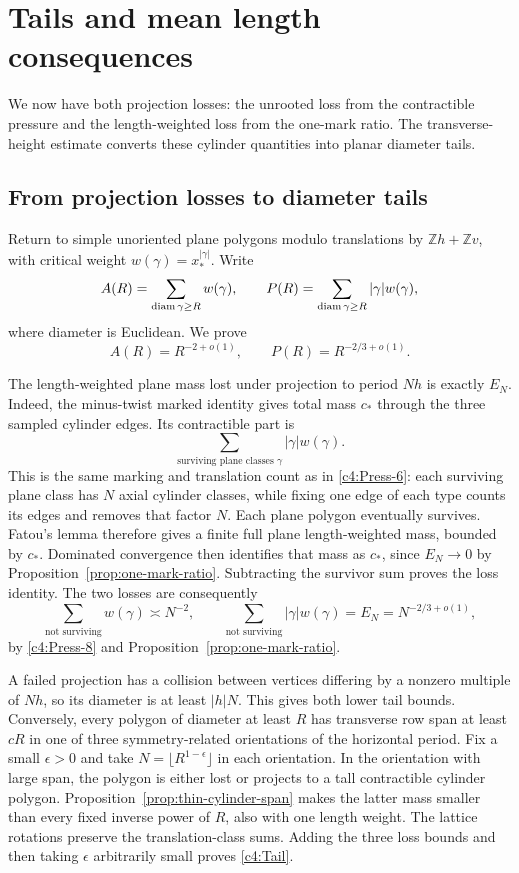 \section{Tails and mean length consequences}\label{c4:tails}

We now have both projection losses: the unrooted loss from the
contractible pressure and the length-weighted loss from the one-mark
ratio. The transverse-height estimate converts these cylinder
quantities into planar diameter tails.

\subsection{From projection losses to diameter tails}

Return to simple unoriented plane polygons modulo translations by
$\mathbb Zh+\mathbb Zv$, with critical weight
$w(\gamma)=x_*^{|\gamma|}$. Write
\[
 A(R)=\sum_{\operatorname{diam}\gamma\ge R}w(\gamma),\qquad
 P(R)=\sum_{\operatorname{diam}\gamma\ge R}|\gamma|w(\gamma),
\]
where diameter is Euclidean. We prove
\begin{equation}
 A(R)=R^{-2+o(1)},\qquad P(R)=R^{-2/3+o(1)}.               \label{c4:Tail}
\end{equation}

The length-weighted plane mass lost under projection to period $Nh$
is exactly $E_N$. Indeed, the minus-twist marked identity gives total
mass $c_*$ through the three sampled cylinder edges. Its contractible
part is
\[
 \sum_{\text{surviving plane classes }\gamma}|\gamma|w(\gamma).
\]
This is the same marking and translation count as in
\eqref{c4:Press-6}: each surviving plane class has $N$ axial cylinder
classes, while fixing one edge of each type counts its edges and removes
that factor $N$. Each plane polygon eventually survives. Fatou's lemma
therefore gives a finite full plane length-weighted mass, bounded by
$c_*$. Dominated convergence then identifies that mass as $c_*$, since
$E_N\to0$ by Proposition~\ref{prop:one-mark-ratio}. Subtracting the
survivor sum proves the loss identity. The two losses are consequently
\[
 \sum_{\text{not surviving}}w(\gamma)\asymp N^{-2},\qquad
 \sum_{\text{not surviving}}|\gamma|w(\gamma)
       =E_N=N^{-2/3+o(1)},
\]
by \eqref{c4:Press-8} and Proposition~\ref{prop:one-mark-ratio}.

A failed projection has a collision between vertices differing by a
nonzero multiple of $Nh$, so its diameter is at least $|h|N$. This
gives both lower tail bounds. Conversely, every polygon of diameter at
least $R$ has transverse row span at least $cR$ in one of three
symmetry-related orientations of the horizontal period. Fix a small
$\epsilon>0$ and take $N=\lfloor R^{1-\epsilon}\rfloor$ in each
orientation. In the orientation with large span, the polygon is either
lost or projects to a tall contractible cylinder polygon.
Proposition~\ref{prop:thin-cylinder-span} makes the latter mass smaller
than every fixed inverse power of $R$, also with one length weight.
The lattice rotations preserve the translation-class sums. Adding the
three loss bounds and then taking $\epsilon$ arbitrarily small proves
\eqref{c4:Tail}.

